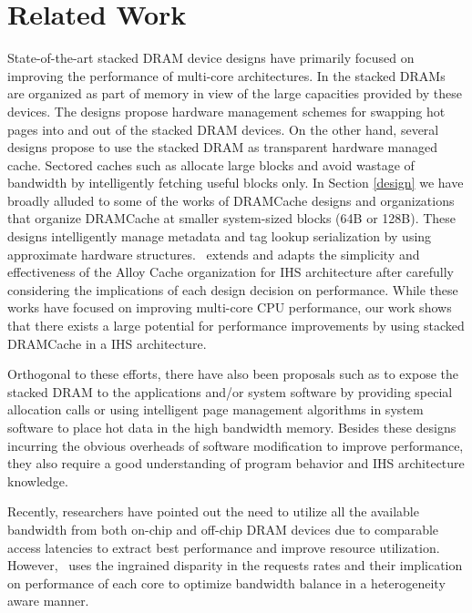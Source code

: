 \section{Related Work} \label{related-work}
State-of-the-art stacked DRAM device designs have primarily focused on improving the performance of multi-core architectures. %
In \cite{pom,cameo} the stacked DRAMs are organized as part of memory in view of the large capacities provided by these devices. The designs propose hardware management schemes for swapping hot pages into and out of the stacked DRAM devices.
On the other hand, several designs propose to use the stacked DRAM as transparent hardware managed cache. Sectored caches such as \cite{footprint,unison-cache} allocate large blocks and avoid wastage of bandwidth by intelligently fetching useful blocks only. In Section \ref{design} we have broadly alluded to some of the works of DRAMCache designs and organizations \cite{alloy,atcache,bimodal,loh-hill} that organize DRAMCache at smaller system-sized blocks (64B or 128B).
These designs intelligently manage metadata and tag lookup serialization by using approximate hardware structures. \cachename\ extends and adapts the simplicity and effectiveness of the Alloy Cache organization for IHS architecture after carefully considering the implications of each design decision on performance. 
While these works have focused on improving multi-core CPU performance, our work shows that there exists a large potential for performance improvements by using stacked DRAMCache in a IHS architecture. 
\par Orthogonal to these efforts, there have also been proposals such as \cite{software-dram} to expose the stacked DRAM to the applications and/or system software by providing special allocation calls or using intelligent page management algorithms in system software to place hot data in the high bandwidth memory. Besides these designs incurring the obvious overheads of software modification to improve performance, they also require a good understanding of program behavior and IHS architecture knowledge.
\par Recently, researchers have pointed out the need to utilize all the available bandwidth from both on-chip and off-chip DRAM devices due to comparable access latencies \cite{mostly-clean,mainak-hpca,bear,micro-refresh,mostly-clean-direct} to extract best performance and improve resource utilization. However, \cachename\ uses the ingrained disparity in the requests rates and their implication on performance of each core to optimize bandwidth balance in a heterogeneity aware manner. 
